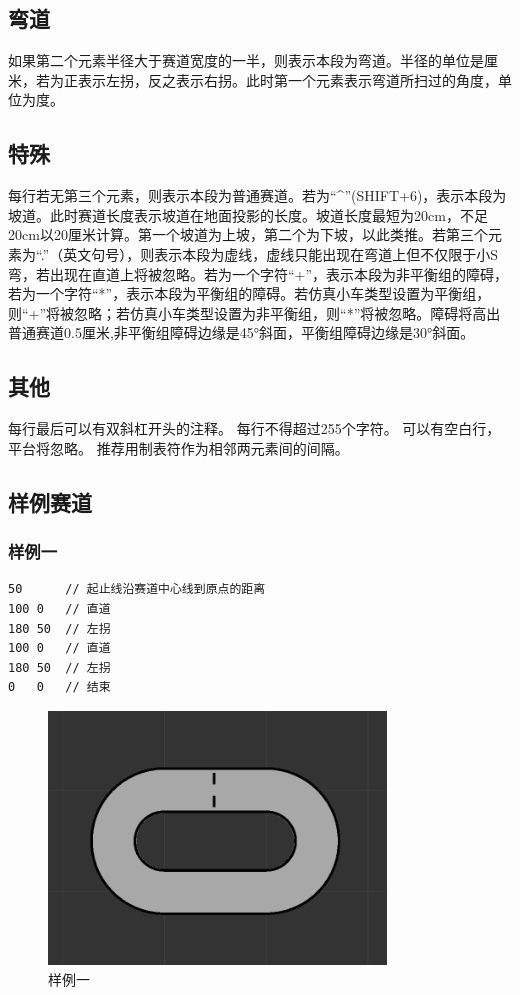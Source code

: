 \documentclass[titlepage,a4paper]{ctexart}
\begin{document}
\subsection{弯道}
如果第二个元素半径大于赛道宽度的一半，则表示本段为弯道。半径的单位是厘米，若为正表示左拐，反之表示右拐。此时第一个元素表示弯道所扫过的角度，单位为度。
\subsection{特殊}
每行若无第三个元素，则表示本段为普通赛道。若为“\textasciicircum”(SHIFT+6)，表示本段为坡道。此时赛道长度表示坡道在地面投影的长度。坡道长度最短为20cm，不足20cm以20厘米计算。第一个坡道为上坡，第二个为下坡，以此类推。若第三个元素为“.”（英文句号），则表示本段为虚线，虚线只能出现在弯道上但不仅限于小S弯，若出现在直道上将被忽略。若为一个字符“+”，表示本段为非平衡组的障碍，若为一个字符“*”，表示本段为平衡组的障碍。若仿真小车类型设置为平衡组，则“+”将被忽略；若仿真小车类型设置为非平衡组，则“*”将被忽略。障碍将高出普通赛道0.5厘米,非平衡组障碍边缘是45°斜面，平衡组障碍边缘是30°斜面。
\subsection{其他}
每行最后可以有双斜杠开头的注释。
每行不得超过255个字符。
可以有空白行，平台将忽略。
推荐用制表符作为相邻两元素间的间隔。
\subsection{样例赛道}
\subsubsection{样例一}
\begin{lstlisting}
50		// 起止线沿赛道中心线到原点的距离
100	0	// 直道
180	50	// 左拐
100	0	// 直道
180	50	// 左拐
0	0	// 结束
\end{lstlisting}
\begin{figure}[!htbp]
\centering
\includegraphics[width=0.80\textwidth]{demo1.png}
\caption{样例一}
\end{figure}
\newpage
\end{document}
